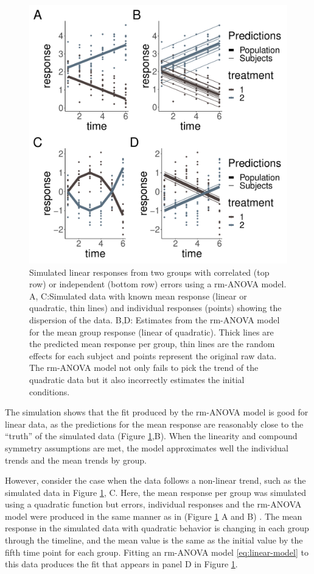 \documentclass[
]{article}
\begin{document}
\begin{figure}[H]

{\centering \includegraphics[width=0.75\linewidth,]{Full_document_files/figure-latex/l-q-response-1} 

}

\caption{Simulated linear responses from two groups with correlated (top row) or independent (bottom row) errors using a rm-ANOVA model. A, C:Simulated data with known mean response (linear or quadratic, thin lines) and individual responses (points) showing the dispersion of the data. B,D: Estimates from the rm-ANOVA model for the mean group response (linear of quadratic). Thick lines are the predicted mean response per group, thin lines are the random effects for each subject and points represent the original raw data. The rm-ANOVA model not only fails to pick the trend of the quadratic data but it also incorrectly estimates the initial conditions.}\label{fig:l-q-response}
\end{figure}

The simulation shows that the fit produced by the rm-ANOVA model is good for linear data, as the predictions for the mean response are reasonably close to the ``truth'' of the simulated data (Figure \ref{fig:l-q-response},B). When the linearity and compound symmetry assumptions are met, the model approximates well the individual trends and the mean trends by group.

However, consider the case when the data follows a non-linear trend, such as the simulated data in Figure \ref{fig:l-q-response}, C. Here, the mean response per group was simulated using a quadratic function but errors, individual responses and the rm-ANOVA model were produced in the same manner as in (Figure \ref{fig:l-q-response} A and B) . The mean response in the simulated data with quadratic behavior is changing in each group through the timeline, and the mean value is the same as the initial value by the fifth time point for each group. Fitting an rm-ANOVA model \eqref{eq:linear-model} to this data produces the fit that appears in panel D in Figure \ref{fig:l-q-response}.
\end{document}
